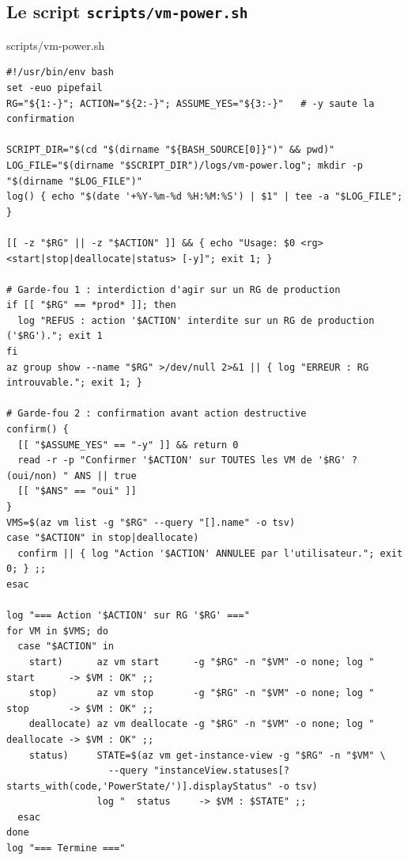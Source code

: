 \documentclass[11pt,a4paper]{article}
\newcommand{\code}[1]{\texttt{#1}}
\begin{document}
\subsection{Le script \code{scripts/vm-power.sh}}
\begin{codebox}{scripts/vm-power.sh}
\begin{Verbatim}
#!/usr/bin/env bash
set -euo pipefail
RG="${1:-}"; ACTION="${2:-}"; ASSUME_YES="${3:-}"   # -y saute la confirmation

SCRIPT_DIR="$(cd "$(dirname "${BASH_SOURCE[0]}")" && pwd)"
LOG_FILE="$(dirname "$SCRIPT_DIR")/logs/vm-power.log"; mkdir -p "$(dirname "$LOG_FILE")"
log() { echo "$(date '+%Y-%m-%d %H:%M:%S') | $1" | tee -a "$LOG_FILE"; }

[[ -z "$RG" || -z "$ACTION" ]] && { echo "Usage: $0 <rg> <start|stop|deallocate|status> [-y]"; exit 1; }

# Garde-fou 1 : interdiction d'agir sur un RG de production
if [[ "$RG" == *prod* ]]; then
  log "REFUS : action '$ACTION' interdite sur un RG de production ('$RG')."; exit 1
fi
az group show --name "$RG" >/dev/null 2>&1 || { log "ERREUR : RG introuvable."; exit 1; }

# Garde-fou 2 : confirmation avant action destructive
confirm() {
  [[ "$ASSUME_YES" == "-y" ]] && return 0
  read -r -p "Confirmer '$ACTION' sur TOUTES les VM de '$RG' ? (oui/non) " ANS || true
  [[ "$ANS" == "oui" ]]
}
VMS=$(az vm list -g "$RG" --query "[].name" -o tsv)
case "$ACTION" in stop|deallocate)
  confirm || { log "Action '$ACTION' ANNULEE par l'utilisateur."; exit 0; } ;;
esac

log "=== Action '$ACTION' sur RG '$RG' ==="
for VM in $VMS; do
  case "$ACTION" in
    start)      az vm start      -g "$RG" -n "$VM" -o none; log "  start      -> $VM : OK" ;;
    stop)       az vm stop       -g "$RG" -n "$VM" -o none; log "  stop       -> $VM : OK" ;;
    deallocate) az vm deallocate -g "$RG" -n "$VM" -o none; log "  deallocate -> $VM : OK" ;;
    status)     STATE=$(az vm get-instance-view -g "$RG" -n "$VM" \
                  --query "instanceView.statuses[?starts_with(code,'PowerState/')].displayStatus" -o tsv)
                log "  status     -> $VM : $STATE" ;;
  esac
done
log "=== Termine ==="
\end{Verbatim}
\end{codebox}
\end{document}
